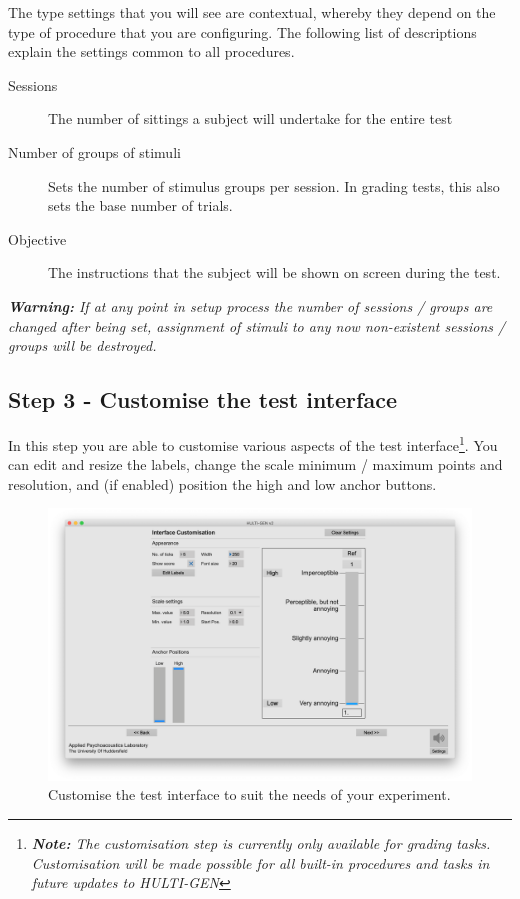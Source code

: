The type settings that you will see are contextual, whereby they depend on the type of procedure that you are configuring. The following list of descriptions explain the settings common to all procedures.

\begin{description}
	\item[Sessions] The number of sittings a subject will undertake for the entire test
	\item[Number of groups of stimuli] Sets the number of stimulus groups per session. In grading tests, this also sets the base number of trials.
	\item[Objective] The instructions that the subject will be shown on screen during the test.
\end{description}

\noindent
\textit{\textbf{Warning:} If at any point in setup process the number of sessions / groups are changed after being set, assignment of stimuli to any now non-existent sessions / groups will be destroyed.}

\subsection{Step 3 - Customise the test interface}

In this step you are able to customise various aspects of the test interface\footnote{\textit{\textbf{Note:} The customisation step is currently only available for grading tasks. Customisation will be made possible for all built-in procedures and tasks in future updates to HULTI-GEN}}. You can edit and resize the labels, change the scale minimum / maximum points and resolution, and (if enabled) position the high and low anchor buttons.

\begin{figure}[ht]
	\centering
	\includegraphics[width=1.0\textwidth]{./images/createTest_step04_customisation.png}
	\caption{Customise the test interface to suit the needs of your experiment.}
	\label{create::customisation}
\end{figure}

